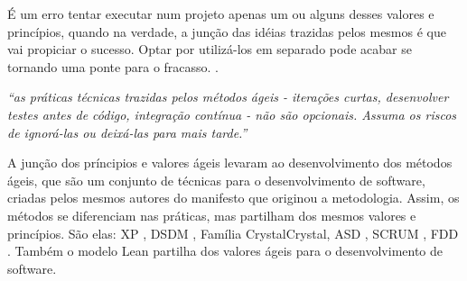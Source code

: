 É um erro tentar executar num projeto apenas um ou alguns desses valores e princípios, quando na verdade, a junção das idéias trazidas pelos mesmos é que vai propiciar o sucesso. Optar por utilizá-los em separado pode acabar se tornando uma ponte para o fracasso. .

\begin{center}\textit{``as práticas técnicas trazidas pelos métodos ágeis - iterações curtas, desenvolver testes antes de código, integração contínua - não são opcionais. Assuma os riscos de ignorá-las ou deixá-las para mais tarde.''}  \end{center}

A junção dos príncipios e valores ágeis levaram ao desenvolvimento dos métodos ágeis, que são um conjunto de técnicas para o desenvolvimento de software, criadas pelos mesmos autores do manifesto que originou a metodologia. Assim,  os métodos se diferenciam nas práticas, mas partilham dos mesmos valores e princípios. São elas: XP \cite{XPExplained}, DSDM \cite{DSDM}, Família Crystal{Crystal}, ASD \cite{ASD}, SCRUM \cite {ScrumXP}, FDD . Também o modelo Lean \cite{Lean} partilha dos valores ágeis para o desenvolvimento de software.

